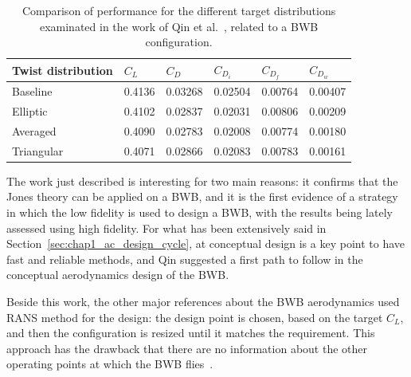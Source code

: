 \begin{table}[!h]
	\centering
	\caption{Comparison of performance for the different target distributions examinated in the work of Qin et al.~\cite{bib:qin}, related to a BWB configuration.}
	\begin{tabular}{l l l l l l}
		\hline
		{Twist distribution}  & {$C_L$} & {$C_{D}$} & {$C_{D_{i}}$} & {$C_{D_{f}}$} & {$C_{D_{w}}$} \\
		\hline
		Baseline     & 0.4136 & 0.03268 & 0.02504 & 0.00764 & 0.00407 \\
		Elliptic     & 0.4102 & 0.02837 & 0.02031 & 0.00806 & 0.00209 \\
		Averaged     & 0.4090 & 0.02783 & 0.02008 & 0.00774 & 0.00180 \\
		Triangular   & 0.4071 & 0.02866 & 0.02083 & 0.00783 & 0.00161 \\
		\hline
	\end{tabular}
	\label{tab:qin_load_results}
\end{table} 

The work just described is interesting for two main reasons: it confirms that the Jones theory can be applied on a BWB, and it is the first evidence of a strategy in which the low fidelity is used to design a BWB, with the results being lately assessed using high fidelity. 
For what has been extensively said in Section~\ref{sec:chap1_ac_design_cycle}, at conceptual design is a key point to have fast and reliable methods, and Qin suggested a first path to follow in the conceptual aerodynamics design of the BWB. 

Beside this work, the other major references about the BWB aerodynamics used RANS method for the design: the design point is chosen, based on the target $C_L$, and then the configuration is resized until it matches the requirement.
This approach has the drawback that there are no information about the other operating points at which the BWB flies~\cite{bib:li_bwb}.
 
